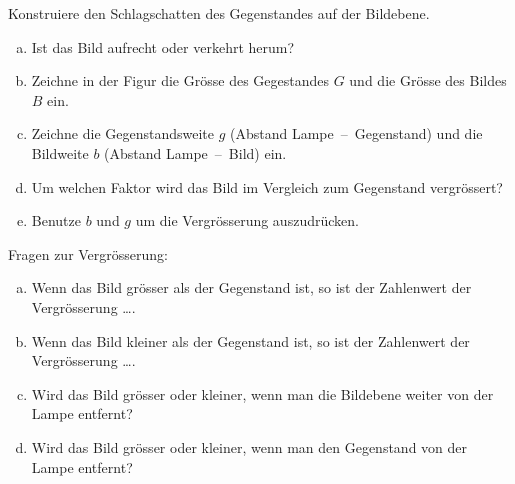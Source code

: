 \documentclass[paper=a4,twoside=true,,DIV13,BCOR1cm]{scrartcl}
\begin{document}
\begin{aufgabe}
	Konstruiere den Schlagschatten des Gegenstandes auf der Bildebene.


\begin{enumerate}[a)]
	\item Ist das Bild aufrecht oder verkehrt herum?
	\item Zeichne in der Figur die Grösse des Gegestandes $G$ und die Grösse des Bildes $B$ ein.
	\item Zeichne die Gegenstandsweite $g$ (Abstand Lampe\ --\ Gegenstand) und die Bildweite $b$
		(Abstand Lampe\ --\ Bild) ein.
	\item Um welchen Faktor wird das Bild im Vergleich zum Gegenstand vergrössert?
	\item Benutze $b$ und $g$ um die Vergrösserung auszudrücken.
\end{enumerate}
\end{aufgabe}




\begin{aufgabe}
	Fragen zur Vergrösserung:
	\begin{enumerate}[a)]
		\item Wenn das Bild grösser als der Gegenstand ist, so ist der Zahlenwert der Vergrösserung \ldots.
		\item Wenn das Bild kleiner als der Gegenstand ist, so ist der Zahlenwert der Vergrösserung \ldots.
		\item Wird das Bild grösser oder kleiner, wenn man die Bildebene weiter von der Lampe entfernt?
		\item Wird das Bild grösser oder kleiner, wenn man den Gegenstand von der Lampe entfernt?
	\end{enumerate}
\end{aufgabe}
\end{document}
